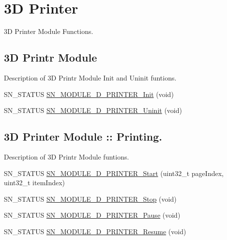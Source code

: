 \hypertarget{group__Module}{}\section{3D Printer}
\label{group__Module}


3D Printer Module Functions.  


\subsection*{3D Printr Module}
\label{_amgrp31919ac2a63e9801f2c4fb221e60d48f}%
Description of 3D Printr Module Init and Uninit funtions. \begin{DoxyCompactItemize}
\item 
S\+N\+\_\+\+S\+T\+A\+T\+US \hyperlink{group__Module_ga801e265ffe6f8c56081112f4fdd35f39}{S\+N\+\_\+\+M\+O\+D\+U\+L\+E\+\_\+D\+\_\+\+P\+R\+I\+N\+T\+E\+R\+\_\+\+Init} (void)
\item 
S\+N\+\_\+\+S\+T\+A\+T\+US \hyperlink{group__Module_ga776f5e31b0c0e176e35669f9432baec0}{S\+N\+\_\+\+M\+O\+D\+U\+L\+E\+\_\+D\+\_\+\+P\+R\+I\+N\+T\+E\+R\+\_\+\+Uninit} (void)
\end{DoxyCompactItemize}
\subsection*{3D Printer Module \+:\+: Printing.}
\label{_amgrpc4945650ed87e7ed89ffb690e375bfb1}%
Description of 3D Printr Module funtions. \begin{DoxyCompactItemize}
\item 
S\+N\+\_\+\+S\+T\+A\+T\+US \hyperlink{group__Module_ga439ebb10f8ee839218655c5177e9110b}{S\+N\+\_\+\+M\+O\+D\+U\+L\+E\+\_\+D\+\_\+\+P\+R\+I\+N\+T\+E\+R\+\_\+\+Start} (uint32\+\_\+t page\+Index, uint32\+\_\+t item\+Index)
\item 
S\+N\+\_\+\+S\+T\+A\+T\+US \hyperlink{group__Module_ga21ca69a451fafe2c9218c9a1737e1f15}{S\+N\+\_\+\+M\+O\+D\+U\+L\+E\+\_\+D\+\_\+\+P\+R\+I\+N\+T\+E\+R\+\_\+\+Stop} (void)
\item 
S\+N\+\_\+\+S\+T\+A\+T\+US \hyperlink{group__Module_ga84a03238ddc0021011c12839757bf8c2}{S\+N\+\_\+\+M\+O\+D\+U\+L\+E\+\_\+D\+\_\+\+P\+R\+I\+N\+T\+E\+R\+\_\+\+Pause} (void)
\item 
S\+N\+\_\+\+S\+T\+A\+T\+US \hyperlink{group__Module_gaabec8b5f01119d989d725eff26053ca5}{S\+N\+\_\+\+M\+O\+D\+U\+L\+E\+\_\+D\+\_\+\+P\+R\+I\+N\+T\+E\+R\+\_\+\+Resume} (void)
\end{DoxyCompactItemize}
